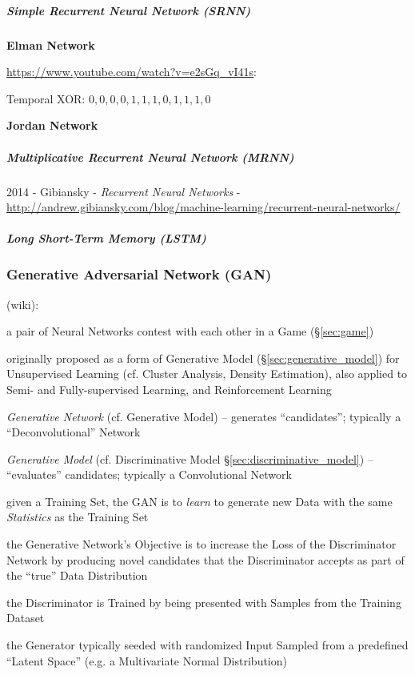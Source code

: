 \subparagraph{Simple Recurrent Neural Network (SRNN)}\label{sec:srnn}\hfill

\textbf{Elman Network}

\url{https://www.youtube.com/watch?v=e2sGq_vI41s}:

Temporal XOR:
$0, 0, 0, 0, 1, 1, 1, 0, 1, 1, 1, 0$


\textbf{Jordan Network}



\subparagraph{Multiplicative Recurrent Neural Network (MRNN)}\label{sec:mrnn}
\hfill

2014 - Gibiansky - \emph{Recurrent Neural Networks} -
\url{http://andrew.gibiansky.com/blog/machine-learning/recurrent-neural-networks/}



\subparagraph{Long Short-Term Memory (LSTM)}\label{sec:lstm}\hfill



\subsubsection{Generative Adversarial Network (GAN)}\label{sec:gan}

(wiki):

a pair of Neural Networks contest with each other in a Game (\S\ref{sec:game})

originally proposed as a form of Generative Model
(\S\ref{sec:generative_model}) for Unsupervised Learning (cf. Cluster Analysis,
Density Estimation),
also applied to Semi- and Fully-supervised Learning, and Reinforcement Learning

\emph{Generative Network} (cf. Generative Model) -- generates ``candidates'';
typically a ``Deconvolutional'' Network

\emph{Generative Model} (cf. Discriminative Model
\S\ref{sec:discriminative_model}) -- ``evaluates'' candidates; typically a
Convolutional Network

given a Training Set, the GAN is to \emph{learn} to generate new Data with the
same \emph{Statistics} as the Training Set

the Generative Network's Objective is to increase the Loss of the Discriminator
Network by producing novel candidates that the Discriminator accepts as part of
the ``true'' Data Distribution

the Discriminator is Trained by being presented with Samples from the Training
Dataset

the Generator typically seeded with randomized Input Sampled from a predefined
``Latent Space'' (e.g. a Multivariate Normal Distribution)

